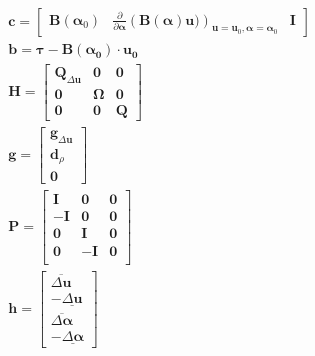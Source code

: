 \begin{equation}
  \label{eq:qpsimple1}
  \begin{aligned}
    & \bm{c}=
    \begin{bmatrix}
      \bm{B}\left(\bm{\alpha}_0 \right)  &
      \frac{\partial}{\partial \bm{\alpha}} \left(\bm{B}(\bm{\alpha})
      \bm{u})\right)_{\bm{u}=\bm{u}_0, \bm{\alpha}=\bm{\alpha}_{0}}
      & \bm{I}
    \end{bmatrix} \\
    & \bm{b}=
    \bm{\tau}-  \bm{B} ( \bm{\alpha_0} ) \cdot \bm{u_0} \\
    & \bm{H}=
    \begin{bmatrix}
      \bm{Q}_{\Delta \bm{u}} & \bm{0} & \bm{0} \\
      \bm{0} & \bm{\Omega} & \bm{0} \\
      \bm{0} & \bm{0} & \bm{Q}
    \end{bmatrix} \\
    & \bm{g}=
    \begin{bmatrix}
       \bm{g}_{\Delta \bm{u}} \\
       \bm{d}_{\rho} \\
       \bm{0}
    \end{bmatrix} \\
    & \bm{P}=
    \begin{bmatrix}
       \bm{I} & \bm{0} & \bm{0} \\
       \bm{-I} & \bm{0} & \bm{0} \\
       \bm{0} & \bm{I} & \bm{0} \\
       \bm{0} & \bm{-I} & \bm{0} \\
    \end{bmatrix} \\
    & \bm{h}=
    \begin{bmatrix}
       \overline{\Delta \bm{u}} \\
       -\underline{\Delta \bm{u}}  \\
       \overline{\Delta \bm{\alpha}} \\
       -\underline{\Delta \bm{\alpha}}
    \end{bmatrix}
  \end{aligned}
\end{equation}

